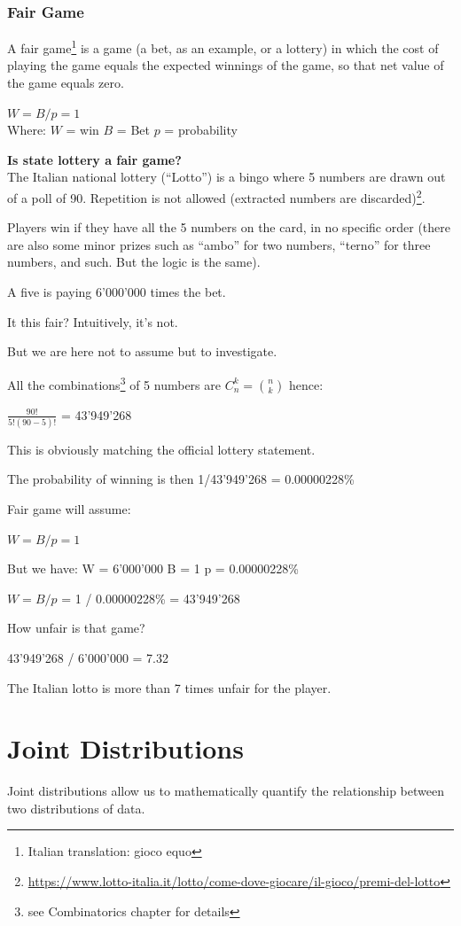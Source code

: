 \documentclass{article}
\begin{document}
\subsubsection{Fair Game}
A fair game\footnote{Italian translation: gioco equo} is a game (a bet, as an example, or a lottery) in which the cost of playing the game equals the expected winnings of the game, so that net value of the game equals zero.

$W = B/p = 1$ 
\mbox{} \\
Where:
$W$ = win
$B$ = Bet
$p$ = probability

\textbf{Is state lottery a fair game?}\\ 
The Italian national lottery (“Lotto”) is a bingo where 5 numbers are drawn out of a poll of 90. Repetition is not allowed (extracted numbers are discarded)\footnote{\url{https://www.lotto-italia.it/lotto/come-dove-giocare/il-gioco/premi-del-lotto}}. 

Players win if they have all the 5 numbers on the card, in no specific order (there are also some minor prizes such as “ambo” for two numbers, “terno” for three numbers, and such. But the logic is the same).

A five is paying 6’000’000 times the bet.

It this fair? Intuitively, it’s not. 

But we are here not to assume but to investigate.

All the combinations\footnote{see Combinatorics chapter for details} of 5 numbers are $ \displaystyle C _n ^k = \binom{n}{k}$ hence:

$\frac{90!}{5!(90 - 5)!}$ = 43’949’268 

This is obviously matching the official lottery statement.

The probability of winning is then 1/43’949’268 = 0.00000228\%

Fair game will assume: 

$W = B/p = 1$

But we have:
W = 6’000’000
B = 1
p = 0.00000228\%

$W = B/p$ = 1 / 0.00000228\% = 43’949’268

How unfair is that game?

43’949’268 / 6’000’000 = 7.32

The Italian lotto is more than 7 times unfair for the player.
\clearpage

\section{Joint Distributions}
Joint distributions allow us to mathematically quantify the relationship between two distributions of data. 
\end{document}
